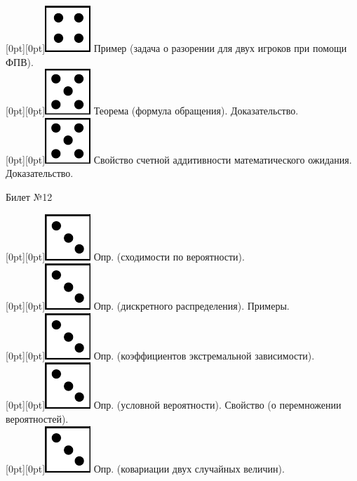 \documentclass[10pt]{article}
\begin{document}
\raisebox{-1pt}[0pt][0pt]{\includegraphics[width=0.02\linewidth]{4.png}} Пример (задача о разорении для двух игроков при помощи ФПВ). \\ 

\raisebox{-1pt}[0pt][0pt]{\includegraphics[width=0.02\linewidth]{5.png}} Теорема (формула обращения). Доказательство. \\

\raisebox{-1pt}[0pt][0pt]{\includegraphics[width=0.02\linewidth]{5.png}}  Свойство счетной аддитивности математического ожидания. Доказательство. \\

\begin{center} {\Large Билет №12} \end{center} 

\raisebox{-1pt}[0pt][0pt]{\includegraphics[width=0.02\linewidth]{3.png}} Опр. (сходимости по вероятности). \\

\raisebox{-1pt}[0pt][0pt]{\includegraphics[width=0.02\linewidth]{3.png}} Опр. (дискретного распределения). Примеры. \\

\raisebox{-1pt}[0pt][0pt]{\includegraphics[width=0.02\linewidth]{3.png}} Опр. (коэффициентов экстремальной зависимости). \\

\raisebox{-1pt}[0pt][0pt]{\includegraphics[width=0.02\linewidth]{3.png}} Опр. (условной вероятности).  Свойство (о перемножении вероятностей). \\ 

\raisebox{-1pt}[0pt][0pt]{\includegraphics[width=0.02\linewidth]{3.png}} Опр. (ковариации двух случайных величин). \\
\end{document}
